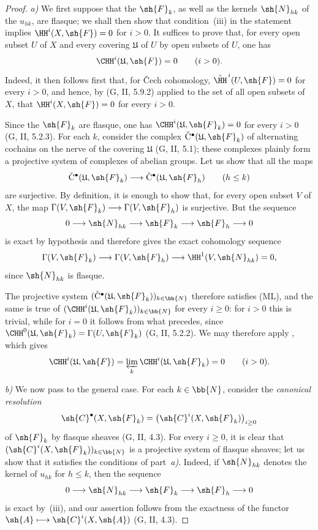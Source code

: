 \begin{proof}
\emph{a)}
We first suppose that the $\sh{F}_k$, as well as the kernels
$\sh{N}_{hk}$ of the $u_{hk}$, are flasque; we shall then show that
condition~{\rm(iii)} in the statement implies
$\HH^i(X,\sh{F})=0$ for $i>0$.
It suffices to prove that, for every open subset $U$ of $X$ and every
covering $\mathfrak{U}$ of $U$ by open subsets of $U$, one has
\[
  \CHH^i(\mathfrak{U},\sh{F})=0
  \qquad (i>0).
\]
Indeed, it then follows first that, for \v{C}ech cohomology,
$\check{\HH}^{\,i}(U,\sh{F})=0$ for every $i>0$, and hence, by
(G, II, 5.9.2) applied to the set of all open subsets of $X$, that
$\HH^i(X,\sh{F})=0$ for every $i>0$.

Since the $\sh{F}_k$ are flasque, one has
$\CHH^i(\mathfrak{U},\sh{F}_k)=0$ for every $i>0$
(G, II, 5.2.3).
For each $k$, consider the complex
$\check{\mathrm{C}}^\bullet(\mathfrak{U},\sh{F}_k)$ of alternating
cochains on the nerve of the covering $\mathfrak{U}$ (G, II, 5.1);
these complexes plainly form a projective system of complexes of
abelian groups.
Let us show that all the maps
\[
  \check{\mathrm{C}}^\bullet(\mathfrak{U},\sh{F}_k)
  \longrightarrow
  \check{\mathrm{C}}^\bullet(\mathfrak{U},\sh{F}_h)
  \qquad(h\leq k)
\]
are surjective.
By definition, it is enough to show that, for every open subset $V$
of $X$, the map
$\Gamma(V,\sh{F}_k)\longrightarrow\Gamma(V,\sh{F}_h)$ is
surjective. But the sequence
\[
  0\longrightarrow\sh{N}_{hk}\longrightarrow\sh{F}_k
  \longrightarrow\sh{F}_h\longrightarrow0
\]
is exact by hypothesis and therefore gives the exact cohomology
sequence
\[
  \Gamma(V,\sh{F}_k)\longrightarrow\Gamma(V,\sh{F}_h)
  \longrightarrow\HH^1(V,\sh{N}_{hk})=0,
\]
since $\sh{N}_{hk}$ is flasque.

The projective system
$(\check{\mathrm{C}}^\bullet(\mathfrak{U},\sh{F}_k))_{k\in\bb{N}}$
therefore satisfies (ML), and the same is true of
$(\CHH^i(\mathfrak{U},\sh{F}_k))_{k\in\bb{N}}$ for every $i\geq0$:
for $i>0$ this is trivial, while for $i=0$ it follows from what
precedes, since
$\CHH^0(\mathfrak{U},\sh{F}_k)=\Gamma(U,\sh{F}_k)$
(G, II, 5.2.2).
We may therefore apply , which gives
\[
  \CHH^i(\mathfrak{U},\sh{F})
  =
  \varprojlim_k\CHH^i(\mathfrak{U},\sh{F}_k)
  =0
  \qquad(i>0).
\]

\emph{b)}
We now pass to the general case. For each $k\in\bb{N}$, consider the
\emph{canonical resolution}
\[
  \sh{C}^\bullet(X,\sh{F}_k)
  =
  \bigl(\sh{C}^i(X,\sh{F}_k)\bigr)_{i\geq0}
\]
of $\sh{F}_k$ by flasque sheaves (G, II, 4.3).
For every $i\geq0$, it is clear that
$(\sh{C}^i(X,\sh{F}_k))_{k\in\bb{N}}$ is a projective system of
flasque sheaves; let us show that it satisfies the conditions of
part~\emph{a)}.
Indeed, if $\sh{N}_{hk}$ denotes the kernel of $u_{hk}$ for $h\leq k$,
then the sequence
\[
  0\longrightarrow\sh{N}_{hk}\longrightarrow\sh{F}_k
  \longrightarrow\sh{F}_h\longrightarrow0
\]
is exact by~{\rm(iii)}, and our assertion follows from the exactness
of the functor
$\sh{A}\longmapsto\sh{C}^i(X,\sh{A})$ (G, II, 4.3).


\end{proof}
